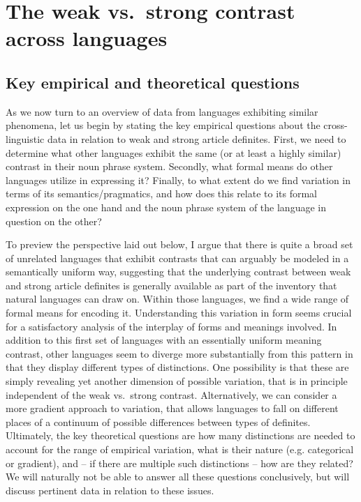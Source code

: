 \documentclass[output=paper
,modfonts
,nonflat]{langscibook}
\begin{document}
\section{The weak vs.\ strong contrast across languages}

\subsection{Key empirical and theoretical questions}

As we now turn to an overview of data from languages exhibiting
similar phenomena, let us begin by stating the key empirical questions
about the cross-linguistic data in relation to weak and strong article
definites. First, we need to determine what other languages exhibit
the same (or at least a highly similar) contrast in their noun phrase
system. Secondly, what formal means do other languages utilize in
expressing it? Finally, to what extent do we find variation
in terms of its semantics/pragmatics, and how does this
relate to its formal expression on the one hand and
the noun phrase system of the language in question on the other?

To preview the perspective laid out below, I argue that there is
quite a broad set of unrelated languages that exhibit contrasts that
can arguably be modeled in a semantically uniform way, suggesting that the underlying
contrast between weak and strong article definites is generally
available as part of the inventory that natural languages can draw on. Within those languages, we
find a wide range of formal means for encoding it. Understanding this variation in form seems crucial for a
satisfactory analysis of the interplay of forms and meanings involved. In addition to this first set of languages with an essentially
uniform meaning contrast, other languages seem to diverge more
substantially from this pattern in that they display different types
of distinctions. One possibility is that these are simply revealing yet
another dimension of possible variation, that is in principle
independent of the weak vs.\ strong contrast. Alternatively, we can
consider a more gradient approach to variation, that allows languages
to fall on different places of a continuum of possible 
differences between types of definites. Ultimately, the key theoretical
questions are how many distinctions are needed to account for the range
of empirical variation, what is their nature (e.g. categorical or
gradient), and -- if there are multiple such distinctions -- how are
they related? We will naturally not be able to answer all these
questions conclusively, but will discuss pertinent data in relation to
these issues.
\end{document}
